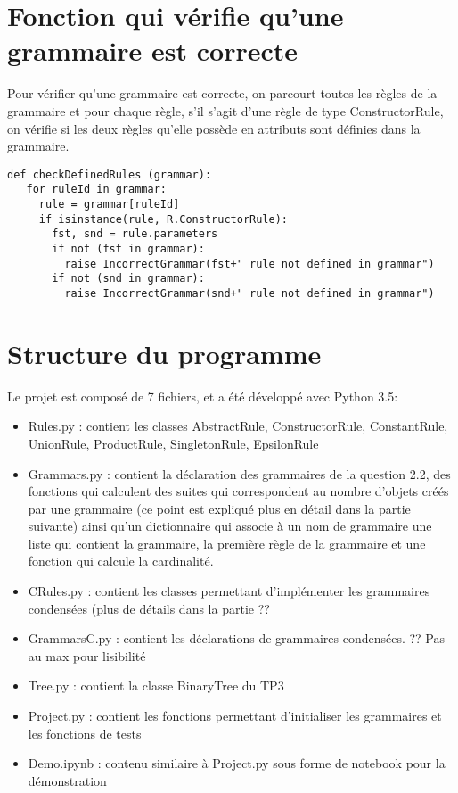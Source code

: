 \documentclass[a4paper, titlepage]{article}
\begin{document}
\section{Fonction qui vérifie qu'une grammaire est correcte}

Pour vérifier qu'une grammaire est correcte, on parcourt toutes les
règles de la grammaire et pour chaque règle, s'il s'agit d'une règle
de type ConstructorRule, on vérifie si les deux règles qu'elle possède
en attributs sont définies dans la grammaire.

\begin{lstlisting}
def checkDefinedRules (grammar):
   for ruleId in grammar:
     rule = grammar[ruleId]
     if isinstance(rule, R.ConstructorRule):
       fst, snd = rule.parameters
       if not (fst in grammar):
         raise IncorrectGrammar(fst+" rule not defined in grammar")
       if not (snd in grammar):
         raise IncorrectGrammar(snd+" rule not defined in grammar")
\end{lstlisting}

\section {Structure du programme}

Le projet est composé de 7 fichiers, et a été développé avec Python 3.5:\\
\begin{itemize}
\item Rules.py : contient les classes AbstractRule, ConstructorRule,
  ConstantRule, UnionRule, ProductRule, SingletonRule, EpsilonRule\\
\item Grammars.py : contient la déclaration des grammaires de la
  question 2.2, des fonctions qui calculent des suites qui
  correspondent au nombre d'objets créés par une grammaire (ce point
  est expliqué plus en détail dans la partie suivante) ainsi qu'un dictionnaire qui associe à un nom de
  grammaire une liste qui contient la grammaire, la première règle de
  la grammaire et une fonction qui calcule la cardinalité.\\
\item CRules.py : contient les classes permettant d'implémenter les
  grammaires condensées (plus de détails dans la partie ??\\
\item GrammarsC.py : contient les déclarations de grammaires
  condensées. ?? Pas au max pour lisibilité\\
\item Tree.py : contient la classe BinaryTree du TP3\\
\item Project.py : contient les fonctions permettant d'initialiser les
  grammaires et les fonctions de tests\\
\item Demo.ipynb : contenu similaire à Project.py sous forme de
  notebook pour la démonstration\\
  
\end{itemize}
\end{document}
